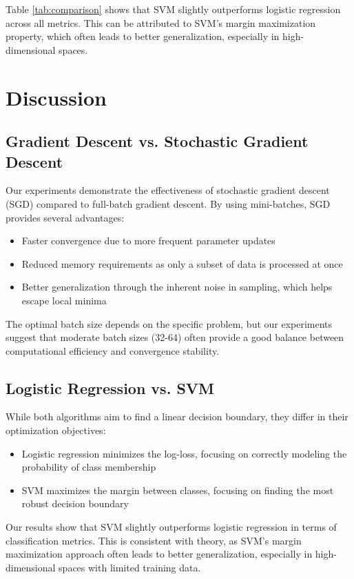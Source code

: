 \documentclass[journal, a4paper]{IEEEtran}
\begin{document}
Table \ref{tab:comparison} shows that SVM slightly outperforms logistic regression across all metrics. This can be attributed to SVM's margin maximization property, which often leads to better generalization, especially in high-dimensional spaces.

\section{Discussion}

\subsection{Gradient Descent vs. Stochastic Gradient Descent}
Our experiments demonstrate the effectiveness of stochastic gradient descent (SGD) compared to full-batch gradient descent. By using mini-batches, SGD provides several advantages:

\begin{itemize}
    \item Faster convergence due to more frequent parameter updates
    \item Reduced memory requirements as only a subset of data is processed at once
    \item Better generalization through the inherent noise in sampling, which helps escape local minima
\end{itemize}

The optimal batch size depends on the specific problem, but our experiments suggest that moderate batch sizes (32-64) often provide a good balance between computational efficiency and convergence stability.

\subsection{Logistic Regression vs. SVM}
While both algorithms aim to find a linear decision boundary, they differ in their optimization objectives:

\begin{itemize}
    \item Logistic regression minimizes the log-loss, focusing on correctly modeling the probability of class membership
    \item SVM maximizes the margin between classes, focusing on finding the most robust decision boundary
\end{itemize}

Our results show that SVM slightly outperforms logistic regression in terms of classification metrics. This is consistent with theory, as SVM's margin maximization approach often leads to better generalization, especially in high-dimensional spaces with limited training data.
\end{document}
